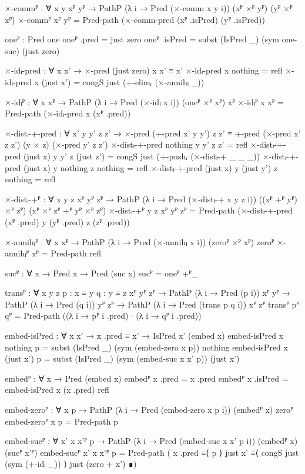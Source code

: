 \begin{code}[hide]
  ×-commᴾ :
    ∀ {x y} xᴾ yᴾ → PathP (λ i → Pred (×-comm x y i)) (xᴾ ×ᴾ yᴾ) (yᴾ ×ᴾ xᴾ)
  ×-commᴾ xᴾ yᴾ = Pred-path (×-comm-pred (xᴾ .isPred) (yᴾ .isPred))

  oneᴾ : Pred one
  oneᴾ .pred = just zero
  oneᴾ .isPred = subst (IsPred _) (sym one-suc) (just zero)

  ×-idₗ-pred : ∀ x x' → ×-pred (just zero) x x' ≡ x'
  ×-idₗ-pred x nothing = refl
  ×-idₗ-pred x (just x') = congS just (+-elimᵣ (×-annihₗ _))

  ×-idₗᴾ : ∀ {x} xᴾ → PathP (λ i → Pred (×-idₗ x i)) (oneᴾ ×ᴾ xᴾ) xᴾ
  ×-idₗᴾ {x} xᴾ = Pred-path (×-idₗ-pred x (xᴾ .pred))

  ×-distₗ-+-pred :
    ∀ x' y y' z z' →
    ×-pred (+-pred x' y y') z z' ≡
    +-pred (×-pred x' z z') (y × z) (×-pred y' z z')
  ×-distₗ-+-pred nothing y y' z z' = refl
  ×-distₗ-+-pred (just x) y y' z (just z') =
    congS just (+-pushᵣ (×-distₗ-+ _ _ _))
  ×-distₗ-+-pred (just x) y nothing z nothing = refl
  ×-distₗ-+-pred (just x) y (just y') z nothing = refl

  ×-distₗ-+ᴾ :
    ∀ {x y z} xᴾ yᴾ zᴾ →
    PathP (λ i → Pred (×-distₗ-+ x y z i))
      ((xᴾ +ᴾ yᴾ) ×ᴾ zᴾ) (xᴾ ×ᴾ zᴾ +ᴾ yᴾ ×ᴾ zᴾ)
  ×-distₗ-+ᴾ {y} {z} xᴾ yᴾ zᴾ =
    Pred-path (×-distₗ-+-pred (xᴾ .pred) y (yᴾ .pred) z (zᴾ .pred))

  ×-annihₗᴾ : ∀ {x} xᴾ → PathP (λ i → Pred (×-annihₗ x i)) (zeroᴾ ×ᴾ xᴾ) zeroᴾ
  ×-annihₗᴾ xᴾ = Pred-path refl

  sucᴾ : ∀ {x} → Pred x → Pred (suc x)
  sucᴾ = oneᴾ +ᴾ_

  transᴾ :
    ∀ {x y z} {p : x ≡ y} {q : y ≡ z} {xᴾ yᴾ zᴾ} →
    PathP (λ i → Pred (p i)) xᴾ yᴾ → PathP (λ i → Pred (q i)) yᴾ zᴾ →
    PathP (λ i → Pred (trans p q i)) xᴾ zᴾ
  transᴾ pᴾ qᴾ = Pred-path ((λ i → pᴾ i .pred) ∙ (λ i → qᴾ i .pred))

  embed-isPred : ∀ x x' → x .pred ≡ x' → IsPred x' (embed x)
  embed-isPred x nothing p = subst (IsPred _) (sym (embed-zero x p)) nothing
  embed-isPred x (just x') p =
    subst (IsPred _) (sym (embed-suc x x' p)) (just x')

  embedᴾ : ∀ x → Pred (embed x)
  embedᴾ x .pred = x .pred
  embedᴾ x .isPred = embed-isPred x (x .pred) refl

  embed-zeroᴾ : ∀ x p → PathP (λ i → Pred (embed-zero x p i)) (embedᴾ x) zeroᴾ
  embed-zeroᴾ x p = Pred-path p

  embed-sucᴾ :
    ∀ {x'} x x'ᴾ p →
    PathP (λ i → Pred (embed-suc x x' p i)) (embedᴾ x) (sucᴾ x'ᴾ)
  embed-sucᴾ {x'} x x'ᴾ p = Pred-path
    ( x .pred          ≡⟨ p ⟩
      just x'          ≡⟨ congS just (sym (+-idₗ _)) ⟩
      just (zero + x') ∎)
\end{code}

